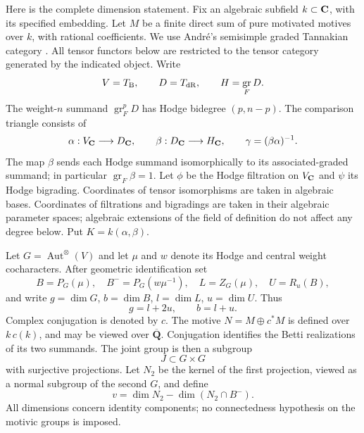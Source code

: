 \documentclass[11pt]{article}
\theoremstyle{definition}\newtheorem{definition}[theorem]{Definition}
\theoremstyle{remark}\newtheorem{remark}[theorem]{Remark}
\newcommand{\Qb}{\overline{\mathbf Q}}\newcommand{\Fp}{\mathbf F_p}
\DeclareMathOperator{\Aut}{Aut}\DeclareMathOperator{\Isom}{Isom}
\DeclareMathOperator{\gr}{gr}\DeclareMathOperator{\GL}{GL}
\begin{document}
Here is the complete dimension statement. Fix an algebraic subfield $k\subset\mathbf C$, with its specified embedding. Let $M$ be a finite direct sum of pure motivated motives over $k$, with rational coefficients. We use Andr\'e's semisimple graded Tannakian category \cite[Theorem 0.4, p.~8; \S4.6, pp.~24--25]{Andre}. All tensor functors below are restricted to the tensor category generated by the indicated object. Write
\[
 V=T_{\B},\qquad D=T_{\dR},\qquad H=\gr_FD.
\]
The weight-$n$ summand $\gr_F^pD$ has Hodge bidegree $(p,n-p)$. The comparison triangle consists of
\[
 \alpha:V_{\mathbf C}\longrightarrow D_{\mathbf C},\qquad
 \beta:D_{\mathbf C}\longrightarrow H_{\mathbf C},\qquad
 \gamma=(\beta\alpha)^{-1}.
\]
The map $\beta$ sends each Hodge summand isomorphically to its associated-graded summand; in particular $\gr_F\beta=1$. Let $\phi$ be the Hodge filtration on $V_{\mathbf C}$ and $\psi$ its Hodge bigrading. Coordinates of tensor isomorphisms are taken in algebraic bases. Coordinates of filtrations and bigradings are taken in their algebraic parameter spaces; algebraic extensions of the field of definition do not affect any degree below. Put $K=k(\alpha,\beta)$.

Let $G=\Aut^{\otimes}(V)$ and let $\mu$ and $w$ denote its Hodge and central weight cocharacters. After geometric identification set
\[
 B=P_G(\mu),\quad B^-=P_G(w\mu^{-1}),\quad
 L=Z_G(\mu),\quad U=R_u(B),
\]
and write $g=\dim G$, $b=\dim B$, $l=\dim L$, $u=\dim U$. Thus
\[
                 g=l+2u,\qquad b=l+u.
\]
Complex conjugation is denoted by $c$. The motive
$N=M\oplus c^*M$ is defined over $k\,c(k)$, and may be viewed over $\Qb$. Conjugation identifies the Betti realizations of its two summands. The joint group is then a subgroup
\[
                   J\subset G\times G
\]
with surjective projections. Let $N_2$ be the kernel of the first projection, viewed as a normal subgroup of the second $G$, and define
\[
             v=\dim N_2-\dim(N_2\cap B^-).
\]
All dimensions concern identity components; no connectedness hypothesis on the motivic groups is imposed.
\end{document}
